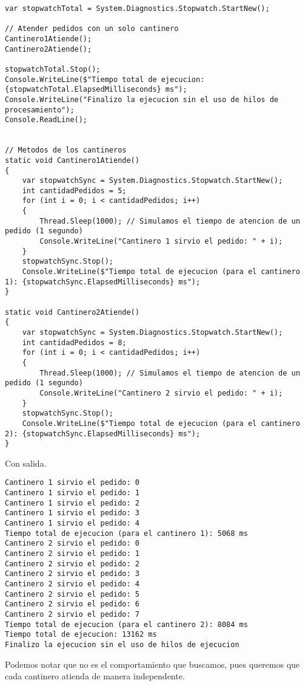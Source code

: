 \documentclass[executivepaper]{article}
\begin{document}
\begin{lstlisting}
var stopwatchTotal = System.Diagnostics.Stopwatch.StartNew();

// Atender pedidos con un solo cantinero
Cantinero1Atiende();
Cantinero2Atiende();

stopwatchTotal.Stop();
Console.WriteLine($"Tiempo total de ejecucion: {stopwatchTotal.ElapsedMilliseconds} ms");
Console.WriteLine("Finalizo la ejecucion sin el uso de hilos de procesamiento");
Console.ReadLine();
    

// Metodos de los cantineros
static void Cantinero1Atiende()
{
    var stopwatchSync = System.Diagnostics.Stopwatch.StartNew();
    int cantidadPedidos = 5;
    for (int i = 0; i < cantidadPedidos; i++)
    {
        Thread.Sleep(1000); // Simulamos el tiempo de atencion de un pedido (1 segundo)
        Console.WriteLine("Cantinero 1 sirvio el pedido: " + i);
    }
    stopwatchSync.Stop();
    Console.WriteLine($"Tiempo total de ejecucion (para el cantinero 1): {stopwatchSync.ElapsedMilliseconds} ms");
}

static void Cantinero2Atiende()
{
    var stopwatchSync = System.Diagnostics.Stopwatch.StartNew();
    int cantidadPedidos = 8;
    for (int i = 0; i < cantidadPedidos; i++)
    {
        Thread.Sleep(1000); // Simulamos el tiempo de atencion de un pedido (1 segundo)
        Console.WriteLine("Cantinero 2 sirvio el pedido: " + i);
    }
    stopwatchSync.Stop();
    Console.WriteLine($"Tiempo total de ejecucion (para el cantinero 2): {stopwatchSync.ElapsedMilliseconds} ms");
}
\end{lstlisting}

Con salida.

\begin{verbatim}
Cantinero 1 sirvio el pedido: 0
Cantinero 1 sirvio el pedido: 1
Cantinero 1 sirvio el pedido: 2
Cantinero 1 sirvio el pedido: 3
Cantinero 1 sirvio el pedido: 4
Tiempo total de ejecucion (para el cantinero 1): 5068 ms
Cantinero 2 sirvio el pedido: 0
Cantinero 2 sirvio el pedido: 1
Cantinero 2 sirvio el pedido: 2
Cantinero 2 sirvio el pedido: 3
Cantinero 2 sirvio el pedido: 4
Cantinero 2 sirvio el pedido: 5
Cantinero 2 sirvio el pedido: 6
Cantinero 2 sirvio el pedido: 7
Tiempo total de ejecucion (para el cantinero 2): 8084 ms
Tiempo total de ejecucion: 13162 ms
Finalizo la ejecucion sin el uso de hilos de ejecucion
\end{verbatim}

Podemos notar que no es el comportamiento que buscamos, pues queremos que cada cantinero atienda de manera independente.
\end{document}
